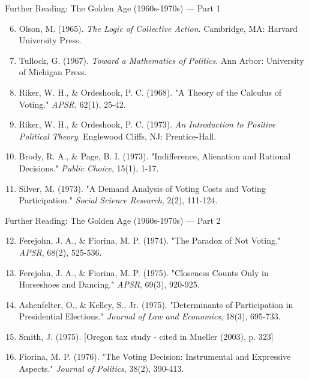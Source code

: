 \documentclass[10pt]{beamer}
\begin{document}
\begin{frame}{Further Reading: The Golden Age (1960s-1970s) — Part 1}
\footnotesize
\begin{enumerate}
\setcounter{enumi}{5}
\item Olson, M. (1965). \emph{The Logic of Collective Action}. Cambridge, MA: Harvard University Press.
\item Tullock, G. (1967). \emph{Toward a Mathematics of Politics}. Ann Arbor: University of Michigan Press.
\item Riker, W. H., \& Ordeshook, P. C. (1968). "A Theory of the Calculus of Voting." \emph{APSR}, 62(1), 25-42.
\item Riker, W. H., \& Ordeshook, P. C. (1973). \emph{An Introduction to Positive Political Theory}. Englewood Cliffs, NJ: Prentice-Hall.
\item Brody, R. A., \& Page, B. I. (1973). "Indifference, Alienation and Rational Decisions." \emph{Public Choice}, 15(1), 1-17.
\item Silver, M. (1973). "A Demand Analysis of Voting Costs and Voting Participation." \emph{Social Science Research}, 2(2), 111-124.
\end{enumerate}
\end{frame}

\begin{frame}{Further Reading: The Golden Age (1960s-1970s) — Part 2}
\footnotesize
\begin{enumerate}
\setcounter{enumi}{11}
\item Ferejohn, J. A., \& Fiorina, M. P. (1974). "The Paradox of Not Voting." \emph{APSR}, 68(2), 525-536.
\item Ferejohn, J. A., \& Fiorina, M. P. (1975). "Closeness Counts Only in Horseshoes and Dancing." \emph{APSR}, 69(3), 920-925.
\item Ashenfelter, O., \& Kelley, S., Jr. (1975). "Determinants of Participation in Presidential Elections." \emph{Journal of Law and Economics}, 18(3), 695-733.
\item Smith, J. (1975). [Oregon tax study - cited in Mueller (2003), p. 323]
\item Fiorina, M. P. (1976). "The Voting Decision: Instrumental and Expressive Aspects." \emph{Journal of Politics}, 38(2), 390-413.
\end{enumerate}
\end{frame}
\end{document}
